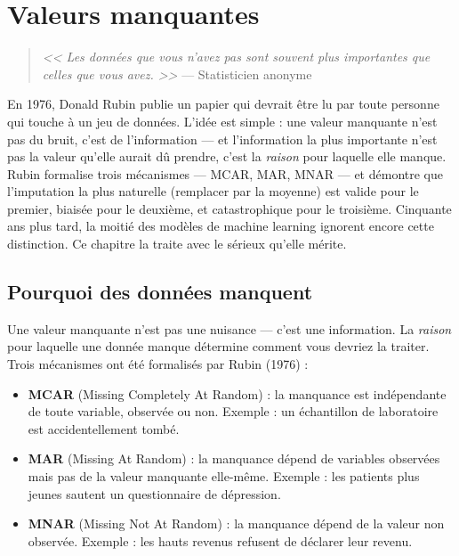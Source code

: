 \chapter{Valeurs manquantes}
\label{ch:missing-data}

\begin{quote}
\emph{<< Les donn\'ees que vous n'avez pas sont souvent plus importantes que celles que vous avez. >>}
--- Statisticien anonyme
\end{quote}

En 1976, Donald Rubin publie un papier qui devrait être lu par toute personne qui touche à un jeu de données. L'idée est simple : une valeur manquante n'est pas du bruit, c'est de l'information --- et l'information la plus importante n'est pas la valeur qu'elle aurait dû prendre, c'est la \emph{raison} pour laquelle elle manque. Rubin formalise trois mécanismes --- MCAR, MAR, MNAR --- et démontre que l'imputation la plus naturelle (remplacer par la moyenne) est valide pour le premier, biaisée pour le deuxième, et catastrophique pour le troisième. Cinquante ans plus tard, la moitié des modèles de machine learning ignorent encore cette distinction. Ce chapitre la traite avec le sérieux qu'elle mérite.
\section{Pourquoi des donn\'ees manquent}

Une valeur manquante n'est pas une nuisance --- c'est une information. La \emph{raison} pour laquelle une donn\'ee manque d\'etermine comment vous devriez la traiter. Trois m\'ecanismes ont \'et\'e formalis\'es par Rubin (1976) :

\begin{definition}
\begin{itemize}
  \item \textbf{MCAR} (Missing Completely At Random) : la manquance est ind\'ependante de toute variable, observ\'ee ou non. Exemple : un \'echantillon de laboratoire est accidentellement tomb\'e.
  \item \textbf{MAR} (Missing At Random) : la manquance d\'epend de variables observ\'ees mais pas de la valeur manquante elle-m\^eme. Exemple : les patients plus jeunes sautent un questionnaire de d\'epression.
  \item \textbf{MNAR} (Missing Not At Random) : la manquance d\'epend de la valeur non observ\'ee. Exemple : les hauts revenus refusent de d\'eclarer leur revenu.
\end{itemize}
\end{definition}

